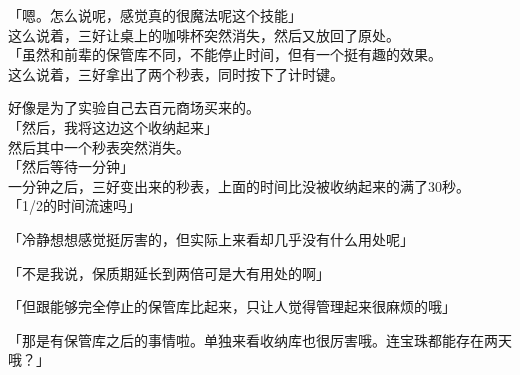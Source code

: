「嗯。怎么说呢，感觉真的很魔法呢这个技能」\\

这么说着，三好让桌上的咖啡杯突然消失，然后又放回了原处。\\

「虽然和前辈的保管库不同，不能停止时间，但有一个挺有趣的效果。\\

这么说着，三好拿出了两个秒表，同时按下了计时键。

好像是为了实验自己去百元商场买来的。\\

「然后，我将这边这个收纳起来」\\

然后其中一个秒表突然消失。\\

「然后等待一分钟」\\

一分钟之后，三好变出来的秒表，上面的时间比没被收纳起来的满了30秒。\\

「1/2的时间流速吗」

「冷静想想感觉挺厉害的，但实际上来看却几乎没有什么用处呢」

「不是我说，保质期延长到两倍可是大有用处的啊」

「但跟能够完全停止的保管库比起来，只让人觉得管理起来很麻烦的哦」

「那是有保管库之后的事情啦。单独来看收纳库也很厉害哦。连宝珠都能存在两天哦？」

